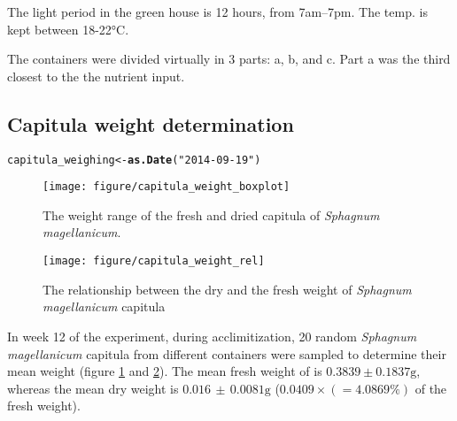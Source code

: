 \documentclass[12pt,a4paper,draft]{article}\usepackage[]{graphicx}\usepackage[]{color}
\makeatletter
\def\maxwidth{ %
  \ifdim\Gin@nat@width>\linewidth
    \linewidth
  \else
    \Gin@nat@width
  \fi
}
\newcommand{\hlstr}[1]{\textcolor[rgb]{0.192,0.494,0.8}{#1}}%
\newcommand{\hlstd}[1]{\textcolor[rgb]{0.345,0.345,0.345}{#1}}%
\newcommand{\hlkwb}[1]{\textcolor[rgb]{0.69,0.353,0.396}{#1}}%
\newcommand{\hlkwd}[1]{\textcolor[rgb]{0.737,0.353,0.396}{\textbf{#1}}}%
\newenvironment{kframe}{%
 \def\at@end@of@kframe{}%
 \ifinner\ifhmode%
  \def\at@end@of@kframe{\end{minipage}}%
  \begin{minipage}{\columnwidth}%
 \fi\fi%
 \def\FrameCommand##1{\hskip\@totalleftmargin \hskip-\fboxsep
 \colorbox{shadecolor}{##1}\hskip-\fboxsep
     \hskip-\linewidth \hskip-\@totalleftmargin \hskip\columnwidth}%
 \MakeFramed {\advance\hsize-\width
   \@totalleftmargin\z@ \linewidth\hsize
   \@setminipage}}%
 {\par\unskip\endMakeFramed%
 \at@end@of@kframe}
\newenvironment{knitrout}{}{} %
\makeatother
\begin{document}
The light period in the green house is 12 hours, from 7am--7pm. The temp. is kept between 18-22°C.

The containers were divided virtually in 3 parts: a, b, and c. Part a was the third closest to the the nutrient input. 

\subsection{Capitula weight determination}

\begin{knitrout}
\color{fgcolor}\begin{kframe}
\begin{alltt}
\hlstd{capitula_weighing} \hlkwb{<-} \hlkwd{as.Date}\hlstd{(}\hlstr{"2014-09-19"}\hlstd{)}
\end{alltt}
\end{kframe}\begin{figure}[htb]

\texttt{[image: figure/capitula\_weight\_boxplot]} \caption[The weight range of the fresh and dried capitula of \textit{Sphagnum magellanicum}]{The weight range of the fresh and dried capitula of \textit{Sphagnum magellanicum}.\label{fig:capitula_weight_boxplot}}
\end{figure}


\end{knitrout}

\begin{knitrout}
\color{fgcolor}\begin{figure}[htb]

\texttt{[image: figure/capitula\_weight\_rel]} \caption[The relationship between the dry and the fresh weight of \textit{Sphagnum magellanicum} capitula]{The relationship between the dry and the fresh weight of \textit{Sphagnum magellanicum} capitula\label{fig:capitula_weight_rel}}
\end{figure}


\end{knitrout}

In week 12 of the experiment, during acclimitization, 20 random \textit{Sphagnum magellanicum} capitula from different containers were sampled to determine their mean weight (figure \ref{fig:capitula_weight_boxplot} and \ref{fig:capitula_weight_rel}). The mean fresh weight of is $0.3839 \pm 0.1837 \mathrm{g}$, whereas the mean dry weight is $0.016 \,\pm\, 0.0081 \mathrm{g}$ ($0.0409 \times (= 4.0869\%)$ of the fresh weight).
\end{document}
